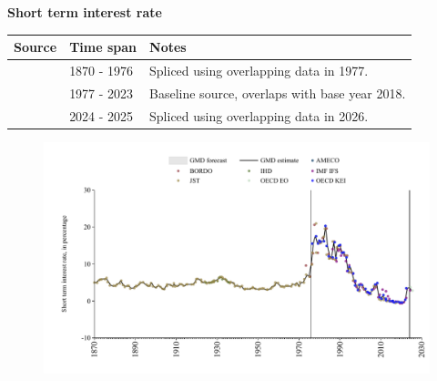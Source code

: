 \documentclass[12pt,a4paper,landscape]{article}
\begin{document}
\begin{adjustbox}{max totalsize={\paperwidth}{\paperheight},center}
\begin{minipage}[t][\textheight][t]{\textwidth}
\vspace*{0.5cm}
{}
\begin{center}
{\Large\bfseries Short term interest rate}
\end{center}
\vspace{0.5cm}
\begin{table}[H]
\centering
\small
\begin{tabular}{|l|l|l|}
\hline
\textbf{Source} & \textbf{Time span} & \textbf{Notes} \\
\hline
\rowcolor{white}\cite{JST}& 1870 - 1976 &Spliced using overlapping data in 1977. \\
\rowcolor{lightgray}\cite{OECD_KEI}& 1977 - 2023 &Baseline source, overlaps with base year 2018. \\
\rowcolor{white}\cite{OECD_EO}& 2024 - 2025 &Spliced using overlapping data in 2026. \\
\hline
\end{tabular}
\end{table}
\begin{figure}[H]
\centering
\includegraphics[width=\textwidth,height=0.6\textheight,keepaspectratio]{graphs/ESP_strate.pdf}
\end{figure}
\end{minipage}
\end{adjustbox}
\end{document}
